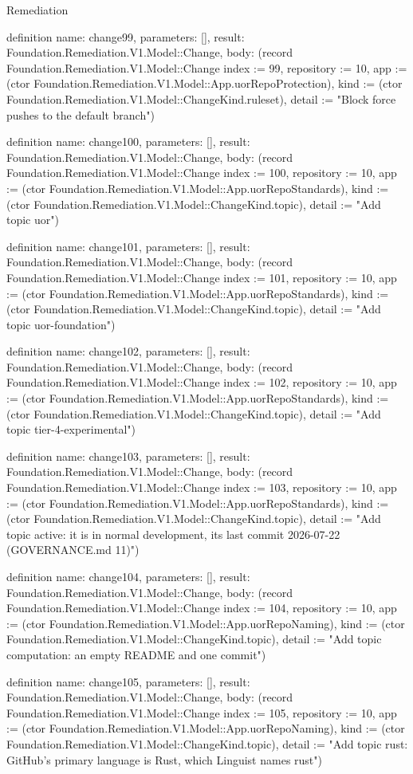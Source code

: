 \begin{lexlean}{Remediation}
\begin{semanticmodule}
definition{
  name: change99,
  parameters: [],
  result: Foundation.Remediation.V1.Model::Change,
  body: (record Foundation.Remediation.V1.Model::Change {index := 99, repository := 10, app := (ctor Foundation.Remediation.V1.Model::App.uorRepoProtection), kind := (ctor Foundation.Remediation.V1.Model::ChangeKind.ruleset), detail := "Block force pushes to the default branch"})
}

definition{
  name: change100,
  parameters: [],
  result: Foundation.Remediation.V1.Model::Change,
  body: (record Foundation.Remediation.V1.Model::Change {index := 100, repository := 10, app := (ctor Foundation.Remediation.V1.Model::App.uorRepoStandards), kind := (ctor Foundation.Remediation.V1.Model::ChangeKind.topic), detail := "Add topic uor"})
}

definition{
  name: change101,
  parameters: [],
  result: Foundation.Remediation.V1.Model::Change,
  body: (record Foundation.Remediation.V1.Model::Change {index := 101, repository := 10, app := (ctor Foundation.Remediation.V1.Model::App.uorRepoStandards), kind := (ctor Foundation.Remediation.V1.Model::ChangeKind.topic), detail := "Add topic uor-foundation"})
}

definition{
  name: change102,
  parameters: [],
  result: Foundation.Remediation.V1.Model::Change,
  body: (record Foundation.Remediation.V1.Model::Change {index := 102, repository := 10, app := (ctor Foundation.Remediation.V1.Model::App.uorRepoStandards), kind := (ctor Foundation.Remediation.V1.Model::ChangeKind.topic), detail := "Add topic tier-4-experimental"})
}

definition{
  name: change103,
  parameters: [],
  result: Foundation.Remediation.V1.Model::Change,
  body: (record Foundation.Remediation.V1.Model::Change {index := 103, repository := 10, app := (ctor Foundation.Remediation.V1.Model::App.uorRepoStandards), kind := (ctor Foundation.Remediation.V1.Model::ChangeKind.topic), detail := "Add topic active: it is in normal development, its last commit 2026-07-22 (GOVERNANCE.md 11)"})
}

definition{
  name: change104,
  parameters: [],
  result: Foundation.Remediation.V1.Model::Change,
  body: (record Foundation.Remediation.V1.Model::Change {index := 104, repository := 10, app := (ctor Foundation.Remediation.V1.Model::App.uorRepoNaming), kind := (ctor Foundation.Remediation.V1.Model::ChangeKind.topic), detail := "Add topic computation: an empty README and one commit"})
}

definition{
  name: change105,
  parameters: [],
  result: Foundation.Remediation.V1.Model::Change,
  body: (record Foundation.Remediation.V1.Model::Change {index := 105, repository := 10, app := (ctor Foundation.Remediation.V1.Model::App.uorRepoNaming), kind := (ctor Foundation.Remediation.V1.Model::ChangeKind.topic), detail := "Add topic rust: GitHub's primary language is Rust, which Linguist names rust"})
}


\end{semanticmodule}
\end{lexlean}
